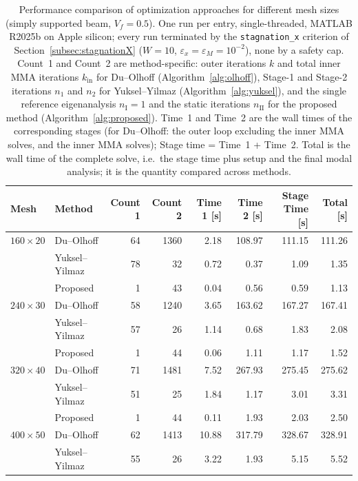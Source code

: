 \documentclass[applsci,article,submit,pdftex,moreauthors]{Definitions/mdpi}
\begin{document}
\begin{table}[H]
\caption{Performance comparison of optimization approaches for different mesh sizes (simply supported beam, $V_f = 0.5$). One run per entry, single-threaded, MATLAB R2025b on Apple silicon; every run terminated by the \texttt{stagnation\_x} criterion of Section~\ref{subsec:stagnationX} ($W = 10$, $\varepsilon_x = \varepsilon_M = 10^{-2}$), none by a safety cap. Count~1 and Count~2 are method-specific: outer iterations $k$ and total inner MMA iterations $k_{\mathrm{in}}$ for Du--Olhoff (Algorithm~\ref{alg:olhoff}), Stage-1 and Stage-2 iterations $n_1$ and $n_2$ for Yuksel--Yilmaz (Algorithm~\ref{alg:yuksel}), and the single reference eigenanalysis $n_{\mathrm{I}} = 1$ and the static iterations $n_{\mathrm{II}}$ for the proposed method (Algorithm~\ref{alg:proposed}). Time~1 and Time~2 are the wall times of the corresponding stages (for Du--Olhoff: the outer loop excluding the inner MMA solves, and the inner MMA solves); Stage time = Time~1 + Time~2. Total is the wall time of the complete solve, i.e.\ the stage time plus setup and the final modal analysis; it is the quantity compared across methods.\label{tab:performance}}
\small
\begin{tabularx}{\textwidth}{llRRRRRR}
\toprule
\textbf{Mesh} & \textbf{Method} & \textbf{Count 1} & \textbf{Count 2} & \textbf{Time 1 [s]} & \textbf{Time 2 [s]} & \textbf{Stage Time [s]} & \textbf{Total [s]} \\
\midrule
$160\times20$ & Du--Olhoff & 64 & 1360 & 2.18 & 108.97 & 111.15 & 111.26 \\
 & Yuksel--Yilmaz & 78 & 32 & 0.72 & 0.37 & 1.09 & 1.35 \\
 & Proposed & 1 & 43 & 0.04 & 0.56 & 0.59 & 1.13 \\
\midrule
$240\times30$ & Du--Olhoff & 58 & 1240 & 3.65 & 163.62 & 167.27 & 167.41 \\
 & Yuksel--Yilmaz & 57 & 26 & 1.14 & 0.68 & 1.83 & 2.08 \\
 & Proposed & 1 & 44 & 0.06 & 1.11 & 1.17 & 1.52 \\
\midrule
$320\times40$ & Du--Olhoff & 71 & 1481 & 7.52 & 267.93 & 275.45 & 275.62 \\
 & Yuksel--Yilmaz & 51 & 25 & 1.84 & 1.17 & 3.01 & 3.31 \\
 & Proposed & 1 & 44 & 0.11 & 1.93 & 2.03 & 2.50 \\
\midrule
$400\times50$ & Du--Olhoff & 62 & 1413 & 10.88 & 317.79 & 328.67 & 328.91 \\
 & Yuksel--Yilmaz & 55 & 26 & 3.22 & 1.93 & 5.15 & 5.52 \\

\end{tabularx}
\end{table}
\end{document}
